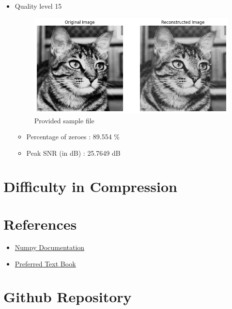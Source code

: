 \documentclass[11pt,a4paper]{article}
\begin{document}
\begin{itemize}
    \newpage


    \item Quality level 15
    {\begin{figure}[h]
        \centering
        \includegraphics[width=1.0\linewidth]{images/im4q3.png}
        \caption{Provided sample file}
    \end{figure}}

    \begin{itemize}
        \item Percentage of zeroes : 89.554 \%
        \item Peak SNR (in dB)     : 25.7649 dB
    \end{itemize}

    
\end{itemize}


\section{Difficulty in Compression}


\section{References}

\begin{itemize}
    \item \href{https://numpy.org/doc/}{Numpy Documentation}
    \item \href{https://www.pearson.com/en-us/subject-catalog/p/discrete-time-signal-processing/P200000003226}{Preferred Text Book}
   
\end{itemize}

\section{Github Repository}
\end{document}
